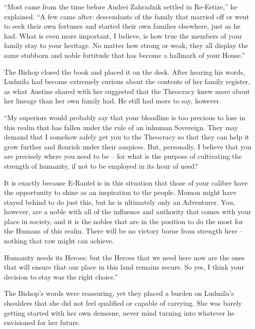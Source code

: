  

“Most came from the time before Andrei Zahradnik settled in Re-Estize,” he explained. “A few came after: descendants of the family that married off or went to seek their own fortunes and started their own families elsewhere, just as he had. What is even more important, I believe, is how true the members of your family stay to your heritage. No matter how strong or weak, they all display the same stubborn and noble fortitude that has become a hallmark of your House.”

 

The Bishop closed the book and placed it on the desk. After hearing his words, Ludmila had become extremely curious about the contents of her family register, as what Austine shared with her suggested that the Theocracy knew more about her lineage than her own family had. He still had more to say, however.

 

“My superiors would probably say that your bloodline is too precious to lose in this realm that has fallen under the rule of an inhuman Sovereign. They may demand that I somehow safely get you to the Theocracy so that they can help it grow further and flourish under their auspices. But, personally, I believe that you are precisely where you need to be – for what is the purpose of cultivating the strength of humanity, if not to be employed in its hour of need?

 

It is exactly because E-Rantel is in this situation that those of your calibre have the opportunity to shine as an inspiration to the people. Momon might have stayed behind to do just this, but he is ultimately only an Adventurer. You, however, are a noble with all of the influence and authority that comes with your place in society, and it is the nobles that are in the position to do the most for the Humans of this realm. There will be no victory borne from strength here – nothing that raw might can achieve.

 

Humanity needs its Heroes: but the Heroes that we need here now are the ones that will ensure that our place in this land remains secure. So yes, I think your decision to stay was the right choice.”

 

The Bishop’s words were reassuring, yet they placed a burden on Ludmila’s shoulders that she did not feel qualified or capable of carrying. She was barely getting started with her own demesne, never mind turning into whatever he envisioned for her future.

